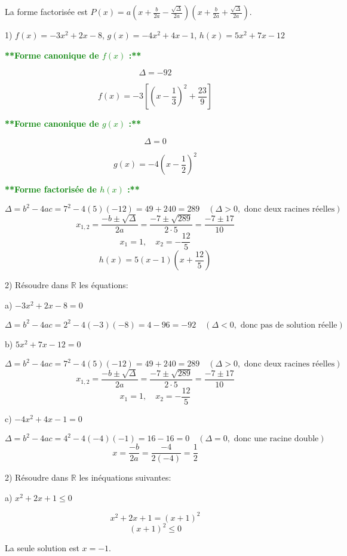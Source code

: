 \documentclass[12pt]{article}
\begin{document}
La forme factorisée est \( P(x) = a\left( x + \frac{b}{2a}-\frac{\sqrt{\Delta}}{2a}\right) \left( x + \frac{b}{2a}+\frac{\sqrt{\Delta}}{2a}\right) \).

1) \( f(x) = -3x^{2} + 2x - 8 \), \( g(x) = -4x^{2} + 4x - 1 \), \( h(x) = 5x^{2} + 7x - 12 \)

\textcolor{green}{\textbf{**Forme canonique de \( f(x) \) :**}}

\[
\Delta = -92
\]

\[
f(x) = -3\left[ \left(x - \frac{1}{3}\right)^{2} + \frac{23}{9}\right] 
\]

\textcolor{green}{\textbf{**Forme canonique de \( g(x) \) :**}}

\[
\Delta = 0
\]

\[
g(x) = -4\left(x - \frac{1}{2}\right)^{2}
\]

\textcolor{green}{\textbf{**Forme factorisée de \( h(x) \) :**}}

\[
\Delta = b^2 - 4ac = 7^2 - 4(5)(-12) = 49 + 240 = 289 \quad (\Delta > 0, \text{ donc deux racines réelles})
\]
\[
x_{1,2} = \frac{-b \pm \sqrt{\Delta}}{2a} = \frac{-7 \pm \sqrt{289}}{2 \cdot 5} = \frac{-7 \pm 17}{10}
\]
\[
x_1 = 1, \quad x_2 = -\frac{12}{5}
\]
\[
h(x) = 5(x - 1)(x + \frac{12}{5})
\]

2) Résoudre dans \(\mathbb{R}\) les équations:

a) \( -3x^{2} + 2x - 8 = 0 \)

\[
\Delta = b^2 - 4ac = 2^2 - 4(-3)(-8) = 4 - 96 = -92 \quad (\Delta < 0, \text{ donc pas de solution réelle})
\]

b) \( 5x^{2} + 7x - 12 = 0 \)

\[
\Delta = b^2 - 4ac = 7^2 - 4(5)(-12) = 49 + 240 = 289 \quad (\Delta > 0, \text{ donc deux racines réelles})
\]
\[
x_{1,2} = \frac{-b \pm \sqrt{\Delta}}{2a} = \frac{-7 \pm \sqrt{289}}{2 \cdot 5} = \frac{-7 \pm 17}{10}
\]
\[
x_1 = 1, \quad x_2 = -\frac{12}{5}
\]

c) \( -4x^{2} + 4x - 1 = 0 \)

\[
\Delta = b^2 - 4ac = 4^2 - 4(-4)(-1) = 16 - 16 = 0 \quad (\Delta = 0, \text{ donc une racine double})
\]
\[
x = \frac{-b}{2a} = \frac{-4}{2(-4)} = \frac{1}{2}
\]

2) Résoudre dans \(\mathbb{R}\) les inéquations suivantes:

a) \( x^{2} + 2x + 1 \leq 0 \)

\[
x^2 + 2x + 1 = (x + 1)^2
\]
\[
(x + 1)^2 \leq 0
\]

La seule solution est \( x = -1 \).
\end{document}
